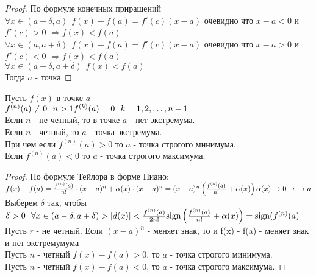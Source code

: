 \begin{proof}
  По формуле конечных приращений\\
  $\forall x \in (a - \delta, a) ~~ f(x) - f(a) = f'(c)(x - a)$ очевидно что
  $x - a < 0$ и \\ $f'(c) > 0$ $\Rightarrow f(x) < f(a)$\\
  $\forall x \in (a, a + \delta) ~~ f(x) - f(a) = f'(c)(x - a)$ очевидно что
  $x - a > 0$ и \\ $f'(c) < 0$ $\Rightarrow f(x) < f(a)$\\
  $\forall x \in (a - \delta, a+ \delta) ~~ f(x) < f(a)$\\
  Тогда $a$ - точка 
\end{proof}

\begin{theorem}
  Пусть $f(x)$ в точке $a$\\
  $f^{(n)} (a) \neq 0 ~~ n > 1\\
  f^{(k)} (a) = 0 ~~ k = 1, 2, \ldots, n-1$\\
  Если $n$ - не четный, то в точке $a$ - нет экстремума.\\
  Если $n$ - четный, то $a$ - точка экстремума.\\
  При чем если $f^{(n)} (a) > 0$ то $a$ - точка строгого минимума.\\
  Если  $f^{(n)} (a) < 0$ то $a$ - точка строгого максимума.
\end{theorem}

\begin{proof}
  По формуле Тейлора в форме Пиано:\\
  $f(x) - f(a) = \frac{f^{(n)}(a)}{n!} \cdot (x - a)^n + \alpha (x)
  \cdot (x - a)^n = (x - a)^n \left(\frac{f^{(n)}(a)}{n!} + \alpha(x) \right)\\
  \alpha (x) \to 0 ~~ x \to a$ \\
  Выберем $\delta$ так, чтобы $\delta > 0 ~~ \forall x \in
  (a - \delta, a + \delta) > |d(x)| < \frac{f^{(n)}(a)}{2n!}\\
  \mathrm{sign} \left(\frac{f^{(n)}(a)}{n!} + \alpha(x)\right) = \mathrm{sign} (f^{(n)}(a)$\\
  Пусть $r$ - не четный. Если $(x - a)^n$ - меняет знак, то и
  f(x) - f(a) - меняет знак и нет экстремумума\\
  Пусть $n$ - четный $f(x) - f(a) > 0$, то $a$ - точка строгого минимума.\\
  Пусть $n$ - четный $f(x) - f(a) < 0$, то $a$ - точка строгого максимума.
\end{proof}

